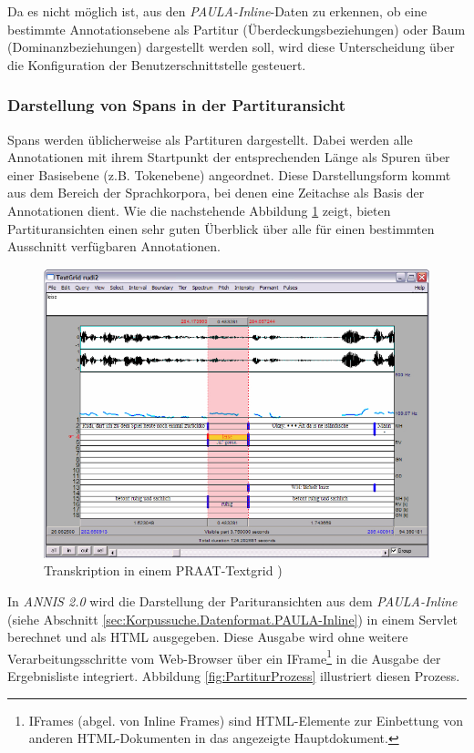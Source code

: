 Da es nicht möglich ist, aus den \emph{PAULA-Inline}-Daten zu erkennen, ob eine bestimmte Annotationsebene als Partitur (Überdeckungsbeziehungen) oder Baum (Dominanzbeziehungen) dargestellt werden soll, wird diese Unterscheidung über die Konfiguration der Benutzerschnittstelle gesteuert.

\subsubsection{Darstellung von Spans in der Partituransicht}\label{sec:Darstellung.Partitur}

Spans werden üblicherweise als Partituren dargestellt. Dabei werden alle Annotationen mit ihrem Startpunkt der entsprechenden Länge als Spuren über einer  Basisebene (z.B. Tokenebene) angeordnet. Diese Darstellungsform kommt aus dem Bereich der Sprachkorpora, bei denen eine Zeitachse als Basis der Annotationen dient. Wie die nachstehende Abbildung \ref{fig:Partitur.Exmaralda} zeigt, bieten Partituransichten einen sehr guten Überblick über alle für einen bestimmten Ausschnitt verfügbaren Annotationen.

\begin{figure}[H]
	\centering
	\includegraphics*[width=1.0\textwidth]{figures/DA/PartiturExmaralda.jpg}
	\caption{Transkription in einem PRAAT-Textgrid \citep[vgl.][Abb. 4]{schmidt2005exmaralda})}\label{fig:Partitur.Exmaralda}
\end{figure}

\newpage
In \emph{ANNIS 2.0} wird die Darstellung der Parituransichten aus dem \emph{PAULA-Inline} (siehe Abschnitt \ref{sec:Korpussuche.Datenformat.PAULA-Inline}) in einem Servlet berechnet und als HTML ausgegeben. Diese Ausgabe wird ohne weitere Verarbeitungsschritte vom Web-Browser über ein IFrame\footnote{IFrames (abgel. von Inline Frames) sind HTML-Elemente zur Einbettung von anderen HTML-Dokumenten in das angezeigte Hauptdokument.} in die Ausgabe der Ergebnisliste integriert. Abbildung \ref{fig:PartiturProzess} illustriert diesen Prozess.

